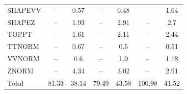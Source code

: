 \begin{table}[H]
\begin{center}
\begin{footnotesize}
\begin{tabular}{lcccccc}
				SHAPEVV & -- &  0.57 & -- &  0.48 & -- &  1.64 \\
				SHAPEZ & -- &  1.93 & -- &  2.91 & -- &  2.7 \\
				TOPPT & -- &  1.61 & -- &  2.11 & -- &  2.44 \\
				TTNORM & -- &  0.67 & -- &  0.5 & -- &  0.51 \\
				VVNORM & -- &  0.6 & -- &  1.0 & -- &  1.18 \\
				ZNORM & -- &  4.34 & -- &  3.02 & -- &  2.91 \\
				Total &  81.33  &  38.14 &  79.49  &  43.58 &  100.98  &  41.52 \\ \hline \hline
			\end{tabular}
			\label{tab:SysUncertainties_2400}
        \end{footnotesize}
	\end{center}
\end{table}


